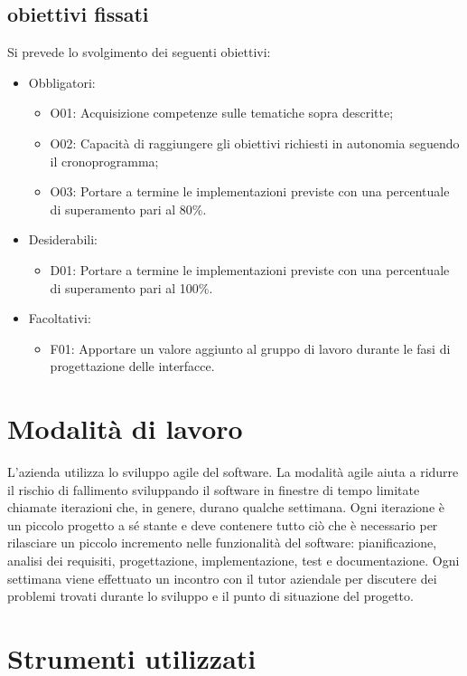 \subsection{obiettivi fissati}
Si prevede lo svolgimento dei seguenti obiettivi:
\begin{itemize}
    \item Obbligatori:
    \begin{itemize}
        \item O01: Acquisizione competenze sulle tematiche sopra descritte;
        \item O02: Capacità di raggiungere gli obiettivi richiesti in autonomia seguendo il cronoprogramma;
        \item O03: Portare a termine le implementazioni previste con una percentuale di superamento pari al 80\%.        
    \end{itemize}
    \item Desiderabili:
     \begin{itemize}
        \item D01: Portare a termine le implementazioni previste con una percentuale di superamento pari al 100\%.
     \end{itemize}
     \item Facoltativi:
     \begin{itemize}
        \item F01: Apportare un valore aggiunto al gruppo di lavoro durante le fasi di progettazione delle interfacce.
     \end{itemize}
\end{itemize}


\section{Modalità di lavoro}
L'azienda utilizza lo sviluppo agile del software. La modalità agile aiuta a ridurre il rischio di fallimento sviluppando il software in finestre di tempo limitate chiamate iterazioni che, in genere, durano qualche settimana. Ogni iterazione è un piccolo progetto a sé stante e deve contenere tutto ciò che è necessario per rilasciare un piccolo incremento nelle funzionalità del software: pianificazione, analisi dei requisiti, progettazione, implementazione, test e documentazione. Ogni settimana viene effettuato un incontro con il tutor aziendale per discutere dei problemi trovati durante lo sviluppo e il punto di situazione del progetto.

\section{Strumenti utilizzati}
